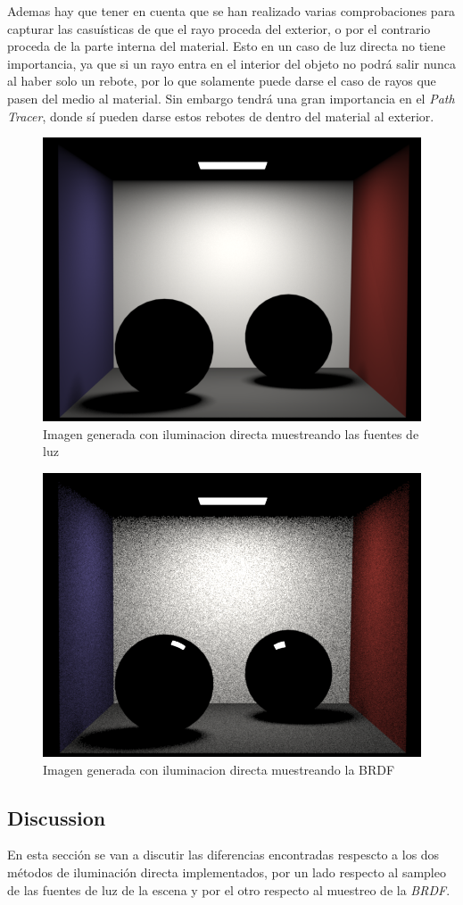 \documentclass[10pt,oneside,a4paper]{article}
\begin{document}
Ademas hay que tener en cuenta que se han realizado varias comprobaciones para capturar las casuísticas de que el rayo proceda del exterior, o por el contrario proceda de la parte interna del material. Esto en un caso de luz directa no tiene importancia, ya que si un rayo entra en el interior del objeto no podrá salir nunca al haber solo un rebote, por lo que solamente puede darse el caso de rayos que pasen del medio al material. Sin embargo tendrá una gran importancia en el \textit{Path Tracer}, donde sí pueden darse estos rebotes de dentro del material al exterior.
 
 \begin{figure}[h]
\centering
\includegraphics[width=.6\linewidth]{images/cbox_direct_ems_comlex_512.png}
\caption{Imagen generada con iluminacion directa muestreando las fuentes de luz}
\label{fig:disp}
\end{figure}

\begin{figure}[h]
\centering
\includegraphics[width=.6\linewidth]{images/cbox_direct_mats_complex_512.png}
\caption{Imagen generada con iluminacion directa muestreando la BRDF}
\label{fig:disp}
\end{figure}

 
 \subsection{Discussion}
 En esta sección se van a discutir las diferencias encontradas respescto a los dos métodos de iluminación directa implementados, por un lado respecto al sampleo de las fuentes de luz de la escena y por el otro respecto al muestreo de la \textit{BRDF}.\\
 
\end{document}
